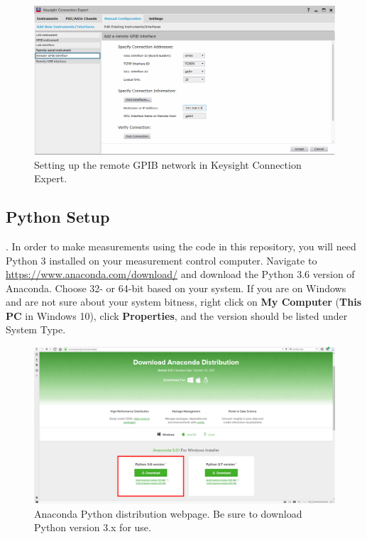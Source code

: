 \documentclass[]{article}
\begin{document}
\begin{figure}[H]
	\centering
	\includegraphics[width=\linewidth]{Figures/kce}
	\caption{Setting up the remote GPIB network in Keysight Connection Expert.}
	\label{fig:kce}
\end{figure}

\subsection{Python Setup}

\ex. In order to make measurements using the code in this repository, you will need Python 3 installed on your measurement control computer. Navigate to \url{https://www.anaconda.com/download/} and download the Python 3.6 version of Anaconda. Choose 32- or 64-bit based on your system. If you are on Windows and are not sure about your system bitness, right click on \textbf{My Computer} (\textbf{This PC} in Windows 10), click \textbf{Properties}, and the version should be listed under System Type.

\begin{figure}[H]
	\centering
	\includegraphics[width=\linewidth]{Figures/anaconda}
	\caption{Anaconda Python distribution webpage. Be sure to download Python version 3.x for use.}
	\label{fig:anaconda}
\end{figure}
\end{document}
